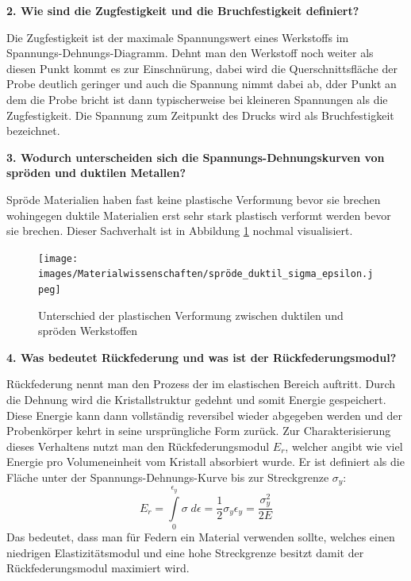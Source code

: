 \noindent\textbf{2. Wie sind die Zugfestigkeit und die Bruchfestigkeit definiert?}\\
\begin{addmargin}[25pt]{0pt}
    Die Zugfestigkeit ist der maximale Spannungswert eines Werkstoffs im Spannungs-Dehnungs-Diagramm. Dehnt man den Werkstoff noch weiter als diesen Punkt kommt es zur Einschnürung, dabei wird die Querschnittsfläche der Probe deutlich geringer und auch die Spannung nimmt dabei ab, dder Punkt an dem die Probe bricht ist dann typischerweise bei kleineren Spannungen als die Zugfestigkeit. Die Spannung zum Zeitpunkt des Drucks wird als Bruchfestigkeit bezeichnet.  \\
\end{addmargin}

\noindent\textbf{3. Wodurch unterscheiden sich die Spannungs-Dehnungskurven von spröden und duktilen Metallen?}\\
\begin{addmargin}[25pt]{0pt}
Spröde Materialien haben fast keine plastische Verformung bevor sie brechen wohingegen duktile Materialien erst sehr stark plastisch verformt werden bevor sie brechen. Dieser Sachverhalt ist in Abbildung \ref{fig:duktil_spröde} nochmal visualisiert.\\
\begin{figure}[h]
    \centering
    \texttt{[image: images/Materialwissenschaften/spröde\_duktil\_sigma\_epsilon.jpeg]}
    \caption{Unterschied der plastischen Verformung zwischen duktilen und spröden Werkstoffen}
    \label{fig:duktil_spröde}
\end{figure}
\end{addmargin}

\noindent\textbf{4. Was bedeutet Rückfederung und was ist der Rückfederungsmodul?}\\
\begin{addmargin}[25pt]{0pt}
Rückfederung nennt man den Prozess der im elastischen Bereich auftritt. Durch die Dehnung wird die Kristallstruktur gedehnt und somit Energie gespeichert. Diese Energie kann dann vollständig reversibel wieder abgegeben werden und der Probenkörper kehrt in seine ursprüngliche Form zurück. Zur Charakterisierung dieses Verhaltens nutzt man den Rückfederungsmodul $E_r$, welcher angibt wie viel Energie pro Volumeneinheit vom Kristall absorbiert wurde. Er ist definiert als die Fläche unter der Spannungs-Dehnungs-Kurve bis zur Streckgrenze $\sigma_y$: 
\begin{equation}\label{eq:Rückfederungsmodul}
    E_r = \int\limits_0^{\epsilon_y}\sigma\; \si{d}\epsilon = \frac{1}{2}\sigma_y\epsilon_y = \frac{\sigma_y^2}{2E}
\end{equation}
Das bedeutet, dass man für Federn ein Material verwenden sollte, welches einen niedrigen Elastizitätsmodul und eine hohe Streckgrenze besitzt damit der Rückfederungsmodul maximiert wird.\\
\end{addmargin}

